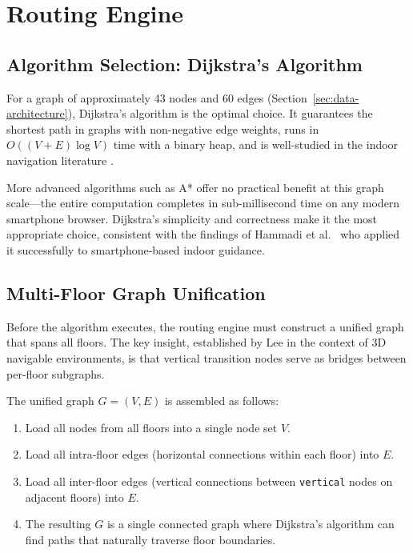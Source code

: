\section{Routing Engine}
\label{sec:routing-engine}

\subsection{Algorithm Selection: Dijkstra's Algorithm}

For a graph of approximately 43 nodes and 60 edges (Section~\ref{sec:data-architecture}), Dijkstra's algorithm is the optimal choice. It guarantees the shortest path in graphs with non-negative edge weights, runs in $O((V + E) \log V)$ time with a binary heap, and is well-studied in the indoor navigation literature \cite{Lee2007, Wu2007, Alqahtani2018}.

More advanced algorithms such as A* offer no practical benefit at this graph scale---the entire computation completes in sub-millisecond time on any modern smartphone browser. Dijkstra's simplicity and correctness make it the most appropriate choice, consistent with the findings of Hammadi et al.\ \cite{Hammadi2012} who applied it successfully to smartphone-based indoor guidance.

\subsection{Multi-Floor Graph Unification}

Before the algorithm executes, the routing engine must construct a unified graph that spans all floors. The key insight, established by Lee \cite{Lee2007} in the context of 3D navigable environments, is that vertical transition nodes serve as bridges between per-floor subgraphs.

The unified graph $G = (V, E)$ is assembled as follows:

\begin{enumerate}
  \item Load all nodes from all floors into a single node set $V$.
  \item Load all intra-floor edges (horizontal connections within each floor) into $E$.
  \item Load all inter-floor edges (vertical connections between \texttt{vertical} nodes on adjacent floors) into $E$.
  \item The resulting $G$ is a single connected graph where Dijkstra's algorithm can find paths that naturally traverse floor boundaries.
\end{enumerate}

